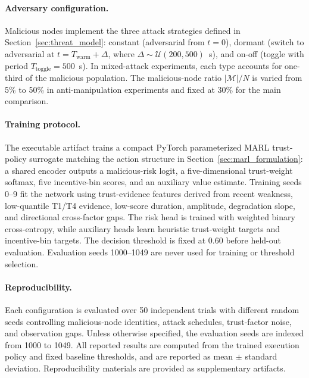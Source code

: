 \documentclass[notspecified,article,submit,moreauthors]{Definitions/mdpi}
\begin{document}
\paragraph{Adversary configuration.}
Malicious nodes implement the three attack strategies defined in Section~\ref{sec:threat_model}: constant (adversarial from $t=0$), dormant (switch to adversarial at $t = T_{\text{warm}} + \Delta$, where $\Delta \sim \mathcal{U}(200, 500)$~s), and on-off (toggle with period $T_{\text{toggle}} = 500$~s). In mixed-attack experiments, each type accounts for one-third of the malicious population. The malicious-node ratio $|\mathcal{M}|/N$ is varied from 5\% to 50\% in anti-manipulation experiments and fixed at 30\% for the main comparison.

\paragraph{Training protocol.}
The executable artifact trains a compact PyTorch parameterized MARL trust-policy surrogate matching the action structure in Section~\ref{sec:marl_formulation}: a shared encoder outputs a malicious-risk logit, a five-dimensional trust-weight softmax, five incentive-bin scores, and an auxiliary value estimate. Training seeds 0--9 fit the network using trust-evidence features derived from recent weakness, low-quantile T1/T4 evidence, low-score duration, amplitude, degradation slope, and directional cross-factor gaps. The risk head is trained with weighted binary cross-entropy, while auxiliary heads learn heuristic trust-weight targets and incentive-bin targets. The decision threshold is fixed at 0.60 before held-out evaluation. Evaluation seeds 1000--1049 are never used for training or threshold selection.

\paragraph{Reproducibility.}
Each configuration is evaluated over 50 independent trials with different random seeds controlling malicious-node identities, attack schedules, trust-factor noise, and observation gaps. Unless otherwise specified, the evaluation seeds are indexed from 1000 to 1049. All reported results are computed from the trained execution policy and fixed baseline thresholds, and are reported as mean $\pm$ standard deviation. Reproducibility materials are provided as supplementary artifacts.
\end{document}
